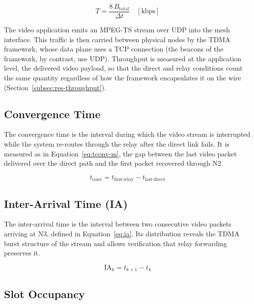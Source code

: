 \begin{equation}
T = \frac{8\,B_{\mathrm{total}}}{\Delta t} \quad [\text{kbps}]
\label{eq:throughput}
\end{equation}

The video application emits an MPEG-TS stream over UDP into the mesh interface.
This traffic is then carried between physical nodes by the TDMA framework, whose
data plane uses a TCP connection (the beacons of the framework, by contrast, use
UDP). Throughput is measured at the application level, the delivered video
payload, so that the direct and relay conditions count the same quantity
regardless of how the framework encapsulates it on the wire
(Section~\ref{subsec:res-throughput}).

\subsection{Convergence Time}
\label{subsec:m-conv}

The convergence time is the interval during which the video stream is
interrupted while the system re-routes through the relay after the direct link
fails. It is measured as in Equation~\ref{eq:tconv-m}, the gap between the last
video packet delivered over the direct path and the first packet recovered
through N2.

\begin{equation}
t_{\mathrm{conv}} = t_{\mathrm{first\,relay}} - t_{\mathrm{last\,direct}}
\label{eq:tconv-m}
\end{equation}

\subsection{Inter-Arrival Time (IA)}
\label{subsec:m-ia}

The inter-arrival time is the interval between two consecutive video packets
arriving at N3, defined in Equation~\ref{eq:ia}. Its distribution reveals the
TDMA burst structure of the stream and allows verification that relay forwarding
preserves it.

\begin{equation}
\mathrm{IA}_k = t_{k+1} - t_k
\label{eq:ia}
\end{equation}

\subsection{Slot Occupancy}
\label{subsec:m-slot}

